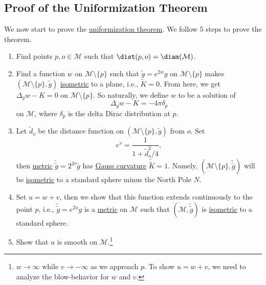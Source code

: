 \subsection{Proof of the Uniformization Theorem}
We now start to prove the \hyperref[thm:uniformization]{uniformization theorem}. We follow \(5\) steps to prove the theorem.
\begin{enumerate}
	\item Find points \(p, o\in \mathcal{M} \) such that \(\dist(p, o) = \diam(\mathcal{M} ) \).
	\item Find a function \(w\) on \(\mathcal{M} \setminus \{ p \} \) such that \(\widetilde{g} = e^{2w} g\) on \(\mathcal{M} \setminus \{ p \} \) makes \((\mathcal{M} \setminus \{ p \} , \widetilde{g} )\) \hyperref[def:isometry]{isometric} to a plane, i.e., \(\widetilde{K} = 0\). From here, we get \(\Delta _g w - K = 0\) on \(\mathcal{M} \setminus \{ p \} \). So naturally, we define \(w\) to be a solution of
	      \[
		      \Delta _g w - K = -4 \pi \delta _p
	      \]
	      on \(\mathcal{M} \), where \(\delta _p\) is the delta Dirac distribution at \(p\).
	\item Let \(\widetilde{d} _o\) be the distance function on \((\mathcal{M} \setminus \{ p \} , \widetilde{g} )\) from \(o\). Set
	      \[
		      e^v = \frac{1}{1 + \widetilde{d} _o^2/4},
	      \]
	      then \hyperref[def:Riemannian-metric]{metric} \(\widetilde{\widetilde{g}} = 2^{2v} \widetilde{g} \) has \hyperref[rmk:Gauss-curvature]{Gauss curvature} \(\widetilde{\widetilde{K}} = 1\). Namely, \((\mathcal{M} \setminus \{ p \} , \widetilde{\widetilde{g}} )\) will be \hyperref[def:isometry]{isometric} to a standard sphere minus the North Pole \(N\).
	\item Set \(u = w + v\), then we show that this function extends continuously to the point \(p\), i.e., \(\widetilde{\widetilde{g}} = e^{2u} g\) is a \hyperref[def:Riemannian-metric]{metric} on \(\mathcal{M} \) such that \((\mathcal{M} , \widetilde{\widetilde{g}} )\) is \hyperref[def:isometry]{isometric} to a standard sphere.
	\item Show that \(u\) is smooth on \(\mathcal{M} \).\footnote{\(w \to \infty \) while \(v \to -\infty \) as we approach \(p\). To show \(u = w + v\), we need to analyze the blow-behavior for \(w\) and \(v\).}
\end{enumerate}